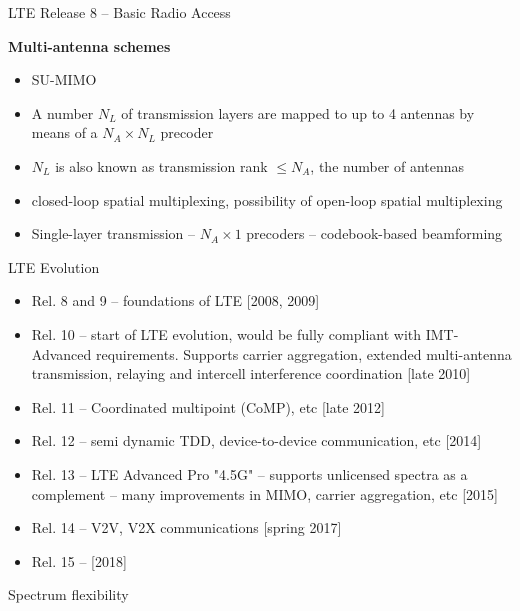 \documentclass{beamer}
\begin{document}
\begin{frame}[allowframebreaks]{LTE Release 8 -- Basic Radio Access}
\begin{itemize}
		\end{itemize}
		\textbf{Multi-antenna schemes}
		\begin{itemize}
			\item SU-MIMO
			\item A number $N_L$ of transmission layers are mapped to up to 4 antennas by means of a $N_A \times N_L$ precoder
			\item $N_L$ is also known as transmission rank $\leq N_A$, the number of antennas
			\item closed-loop spatial multiplexing, possibility of open-loop spatial multiplexing
			\item Single-layer transmission -- $N_A \times 1$ precoders -- codebook-based beamforming
		\end{itemize}
	\end{frame}

	\begin{frame}{LTE Evolution}
		\begin{itemize}
			\item Rel. 8 and 9 -- foundations of LTE [2008, 2009]
			\item Rel. 10 -- start of LTE evolution, would be fully compliant with IMT-Advanced requirements. Supports carrier aggregation, extended multi-antenna transmission, relaying and intercell interference coordination [late 2010]
			\item Rel. 11 -- Coordinated multipoint (CoMP), etc [late 2012]
			\item Rel. 12 -- semi dynamic TDD, device-to-device communication, etc [2014]
			\item Rel. 13 -- LTE Advanced Pro "4.5G" -- supports unlicensed spectra as a complement -- many improvements in MIMO, carrier aggregation, etc [2015]
			\item Rel. 14 -- V2V, V2X communications [spring 2017]
			\item Rel. 15 -- [2018]
		\end{itemize}
	\end{frame}

	\begin{frame}[allowframebreaks]{Spectrum flexibility}
	\end{frame}
\end{document}
